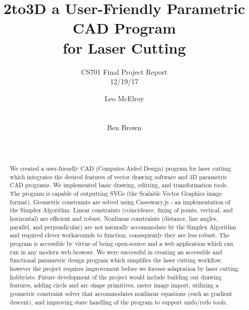 \documentclass{sig-alternate-05-2015}
\begin{document}
\title{2to3D a User-Friendly Parametric CAD Program\\for Laser Cutting}
\subtitle{CS701 Final Project Report \\ 12/19/17}


\author{
%
\alignauthor
Leo McElroy\\
       \\
       \\
\alignauthor
Ben Brown\\
       \\
       \\
}

\maketitle

\begin{abstract}

We created a user-friendly CAD (Computer-Aided Design) program for laser cutting which integrates the desired features of vector drawing software and 3D parametric CAD programs. We implemented basic drawing, editting, and transformation tools. The program is capable of outputting SVGs (the Scalable Vector Graphics image format). Geometric constraints are solved using Cassowary.js - an implementation of the Simplex Algorithm. Linear constraints (coincidence, fixing of points, vertical, and horizontal) are efficient and robust. Nonlinear constraints (distance, line angles, parallel, and perpendicular) are not naturally accommodate by the Simplex Algorithm and required clever workarounds to function, consequently they are less robust. The program is accessible by virtue of being open-source and a web application which can run in any modern web-browser. We were successful in creating an accessible and functional parametric design program which simplifies the laser cutting workflow, however the project requires improvement before we foresee adaptation by laser cutting hobbyists. Future development of the project would include building out drawing features, adding circle and arc shape primitives, raster image import, utilizing a geometric constraint solver that accommodates nonlinear equations (such as gradient descent), and improving state handling of the program to support undo/redo tools.

\end{abstract}

















 

\end{document}
